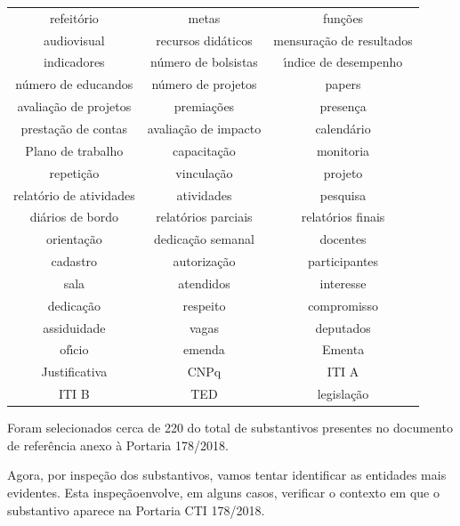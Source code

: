 \documentclass[
12pt,		%
openright,	%
twoside,  %
a4paper,			%
chapter=TITLE,		%
english,			%
french,				%
spanish,			%
brazil				%
]{USPSC-classe/USPSC}
\begin{document}
\begin{table}[htb]
\begin{tabular}{|c|c|c|}
refeit\'orio  &  metas  &  fun\c{c}\~oes \\
audiovisual  &  recursos did\'aticos  &  mensura\c{c}\~ao de resultados \\
indicadores  &  n\'umero de bolsistas  &  \'{\i}ndice de desempenho \\
n\'umero de educandos  &  n\'umero de projetos  &  papers \\
avalia\c{c}\~ao de projetos  &  premia\c{c}\~oes  &  presen\c{c}a  \\
presta\c{c}\~ao de contas  &  avalia\c{c}\~ao de impacto  &  calend\'ario \\
Plano de trabalho  &  capacita\c{c}\~ao  &  monitoria \\
repeti\c{c}\~ao  &  vincula\c{c}\~ao  &  projeto \\
relat\'orio de atividades  &  atividades  &  pesquisa \\
di\'arios de bordo  &  relat\'orios parciais  &  relat\'orios finais \\
orienta\c{c}\~ao  &  dedica\c{c}\~ao semanal  &  docentes \\
cadastro  &  autoriza\c{c}\~ao  &  participantes \\
sala  &  atendidos  &  interesse \\
dedica\c{c}\~ao  &  respeito  &  compromisso \\
assiduidade  &  vagas  &  deputados \\
of\'{\i}cio  &  emenda  &  Ementa \\
Justificativa  &  CNPq  &  ITI A \\
ITI B  &  TED  &  legisla\c{c}\~ao \\
\hline
\end{tabular}
\end{table}


Foram selecionados cerca de 220 do total de substantivos presentes no documento de refer\^encia anexo \`a Portaria 178/2018.














Agora, por inspe\c{c}\~ao dos substantivos, vamos tentar identificar as entidades mais evidentes. Esta \textquotedbl inspe\c{c}\~ao\textquotedbl  envolve, em alguns casos, verificar o contexto em que o substantivo aparece na Portaria CTI 178/2018.
\end{document}
